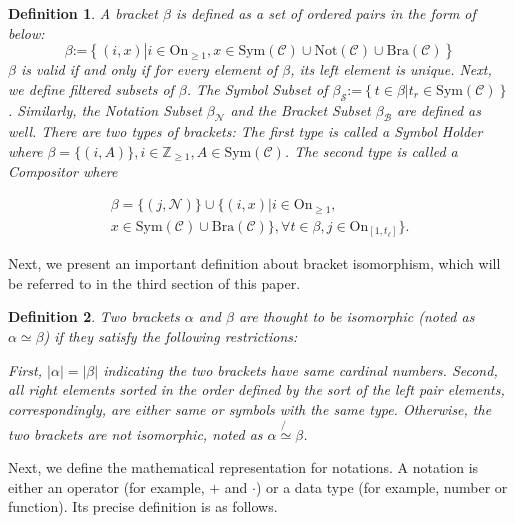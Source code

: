 \documentclass{aims}
\numberwithin{equation}{section}
\newtheorem{definition}{Definition}	%
\numberwithin{theorem}{section}	%
\numberwithin{axiom}{section}	%
\numberwithin{definition}{section}	%
\begin{document}
	\begin{definition}
		A{ bracket} \(\beta\) is defined as a set of ordered pairs in the form of below:
				\begin{equation}
			\beta \text{:=}\left\{(i,x)\left|i\in \text{On}_{\geq 1}\right.,x\in \text{Sym}(\mathcal{C})\cup \text{Not}(\mathcal{C})\cup \text{Bra}(\mathcal{C})\right\}
		\end{equation}
\(\beta\) is valid if and only if for every element of \(\beta\), its left element is unique. Next, we define filtered subsets of \(\beta\). The {Symbol Subset} of \(\beta _{\mathcal{S}}\text{:=}\left\{t\in \beta \left|t_{\mathit{r}}\in \text{Sym}(\mathcal{C})\right.\right\}\). Similarly, the {Notation Subset} \(\beta _{\mathcal{N}}\) and the {Bracket Subset} \(\beta _{\mathcal{B}}\) are defined as well. There are two types of brackets: The first type is called a {Symbol Holder} where \(\beta =\{(i,A)\},i\in \mathbb{Z}_{\geq 1},A\in \text{Sym}(\mathcal{C})\). The second type is called a {Compositor} where
		
		\begin{equation}
			\begin{split}
				\beta =\{(j,\mathcal{N})\}\cup \{(i,x)|i\in \text{On}_{\geq 1},\\ x\in \text{Sym}(\mathcal{C})\cup \text{Bra}(\mathcal{C})\},\forall
				t\in \beta ,j\in \text{On}_{[1,t_{\ell }]}\}.
			\end{split}
		\end{equation}
	\end{definition}
	
	Next, we present an important definition about bracket isomorphism, which will be referred to in the third section of this paper.
	
	\begin{definition}
		Two brackets \(\alpha\) and \(\beta\) are thought to be {isomorphic} (noted as \(\alpha \simeq \beta\)) if they satisfy the following restrictions:
		
		First, \(|\alpha |=|\beta |\) indicating the two brackets have same cardinal numbers. Second, all right elements sorted in the order defined by the sort of the left pair elements, correspondingly, are either same or symbols with the same type. Otherwise, the two brackets are not isomorphic, noted as \(\alpha \not{\simeq}\beta\).
	\end{definition}
	
	Next, we define the mathematical representation for notations. A notation is either an operator (for example, \(+\) and \(\cdot\)) or a data type (for example, number or function). Its precise definition is as follows.
	
\end{document}
